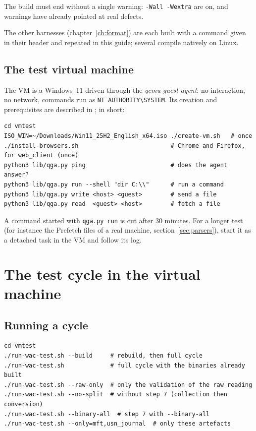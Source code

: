 \documentclass[11pt,a4paper,oneside]{report}
\begin{document}
The build must end without a single warning: \texttt{-Wall -Wextra} are on, and
warnings have already pointed at real defects.

The other harnesses (chapter~\ref{ch:format}) are each built with a command given
in their header and repeated in this guide; several compile natively on Linux.

\section{The test virtual machine}

The VM is a Windows~11 driven through the \emph{qemu-guest-agent}: no
interaction, no network, commands run as
\texttt{NT AUTHORITY\textbackslash SYSTEM}. Its creation and prerequisites are
described in ; in short:

\begin{lstlisting}
cd vmtest
ISO_WIN=~/Downloads/Win11_25H2_English_x64.iso ./create-vm.sh   # once
./install-browsers.sh                          # Chrome and Firefox, for web_client (once)
python3 lib/qga.py ping                        # does the agent answer?
python3 lib/qga.py run --shell "dir C:\\"      # run a command
python3 lib/qga.py write <host> <guest>        # send a file
python3 lib/qga.py read  <guest> <host>        # fetch a file
\end{lstlisting}

\begin{note}
A command started with \texttt{qga.py run} is cut after 30 minutes. For a longer
test (for instance the Prefetch files of a real machine,
section~\ref{sec:parsers}), start it as a detached task in the VM and follow its
log.
\end{note}

\chapter{The test cycle in the virtual machine}\label{ch:vm}

\section{Running a cycle}

\begin{lstlisting}
cd vmtest
./run-wac-test.sh --build     # rebuild, then full cycle
./run-wac-test.sh             # full cycle with the binaries already built
./run-wac-test.sh --raw-only  # only the validation of the raw reading
./run-wac-test.sh --no-split  # without step 7 (collection then conversion)
./run-wac-test.sh --binary-all  # step 7 with --binary-all
./run-wac-test.sh --only=mft,usn_journal  # only these artefacts
\end{lstlisting}
\end{document}
